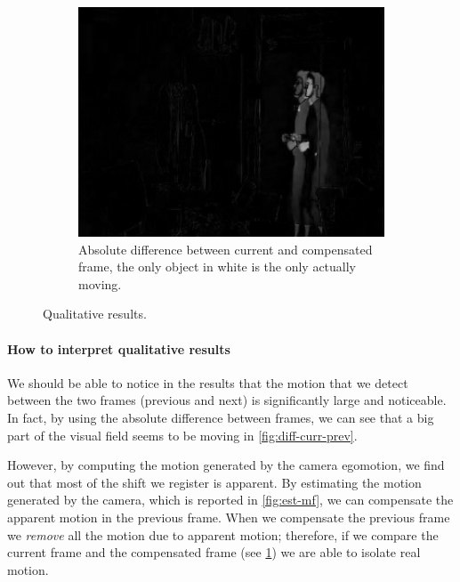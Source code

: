 \begin{figure}[!h]
    \hfill
    \begin{subfigure}[b]{0.3\textwidth}
        \includegraphics[width=1\textwidth]{../assets/images/pan240-diff-curr-comp.png}
        \caption{Absolute difference between current and compensated frame, the only object in white is the only actually moving.}
        \label{fig:diff-curr-comp}
    \end{subfigure}

    \caption{Qualitative results.}
    \label{fig:qualitative-results}
\end{figure}

\paragraph{How to interpret qualitative results} We should be able to notice in the results that the motion that we detect between the two frames (previous and next) is significantly large and noticeable. In fact, by using the absolute difference between frames, we can see that a big part of the visual field seems to be moving in \cref{fig:diff-curr-prev}.

However, by computing the motion generated by the camera egomotion, we find out that most of the shift we register is apparent.
By estimating the motion generated by the camera, which is reported in  \cref{fig:est-mf}, we can compensate the apparent motion in the previous frame.
When we compensate the previous frame we \textit{remove} all the motion due to apparent motion; therefore, if we compare the current frame and the compensated frame (see \cref{fig:diff-curr-comp}) we are able to isolate real motion.

